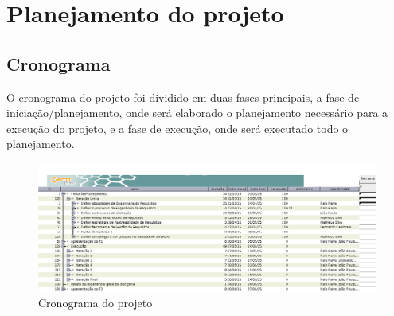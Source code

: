 \chapter[Planejamento do projeto]{Planejamento do projeto}

  \section{Cronograma}
  
   O cronograma do projeto foi dividido em duas fases principais, a fase de iniciação/planejamento, onde será elaborado o planejamento
   necessário para a execução do projeto, e a fase de execução, onde será executado todo o planejamento.
  
  \begin{figure}[!htbp]
    \centering
    \includegraphics[scale=0.5, angle = 90]{editaveis/figuras/cronograma}
    \caption[Cronograma]{Cronograma do projeto}
    \label{cronograma}
  \end{figure}